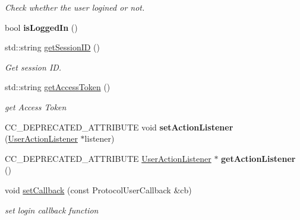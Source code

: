 \begin{DoxyCompactItemize}
\begin{DoxyCompactList}\small\item\em Check whether the user logined or not. \end{DoxyCompactList}\item 
\mbox{\label{classcocos2d_1_1plugin_1_1ProtocolUser_a14d2f4c2998660dfce00c91c66ba9681}} 
bool {\bfseries is\+Logged\+In} ()
\item 
std\+::string \hyperlink{classcocos2d_1_1plugin_1_1ProtocolUser_a3b9114b9523ed62004c65d87d542cbd7}{get\+Session\+ID} ()
\begin{DoxyCompactList}\small\item\em Get session ID. \end{DoxyCompactList}\item 
\mbox{\label{classcocos2d_1_1plugin_1_1ProtocolUser_a95970c546b721163c1dbb2a6e01d1c2a}} 
std\+::string \hyperlink{classcocos2d_1_1plugin_1_1ProtocolUser_a95970c546b721163c1dbb2a6e01d1c2a}{get\+Access\+Token} ()
\begin{DoxyCompactList}\small\item\em get Access Token \end{DoxyCompactList}\item 
\mbox{\label{classcocos2d_1_1plugin_1_1ProtocolUser_af7165fd13537b174556937d0aa32da94}} 
C\+C\+\_\+\+D\+E\+P\+R\+E\+C\+A\+T\+E\+D\+\_\+\+A\+T\+T\+R\+I\+B\+U\+TE void {\bfseries set\+Action\+Listener} (\hyperlink{classcocos2d_1_1plugin_1_1UserActionListener}{User\+Action\+Listener} $\ast$listener)
\item 
\mbox{\label{classcocos2d_1_1plugin_1_1ProtocolUser_aab4215ba588084d3fc130eee5def526d}} 
C\+C\+\_\+\+D\+E\+P\+R\+E\+C\+A\+T\+E\+D\+\_\+\+A\+T\+T\+R\+I\+B\+U\+TE \hyperlink{classcocos2d_1_1plugin_1_1UserActionListener}{User\+Action\+Listener} $\ast$ {\bfseries get\+Action\+Listener} ()
\item 
\mbox{\label{classcocos2d_1_1plugin_1_1ProtocolUser_a8db81ad122601a862123b68c07f18364}} 
void \hyperlink{classcocos2d_1_1plugin_1_1ProtocolUser_a8db81ad122601a862123b68c07f18364}{set\+Callback} (const Protocol\+User\+Callback \&cb)
\begin{DoxyCompactList}\small\item\em set login callback function \end{DoxyCompactList}\item 

\end{DoxyCompactItemize}
